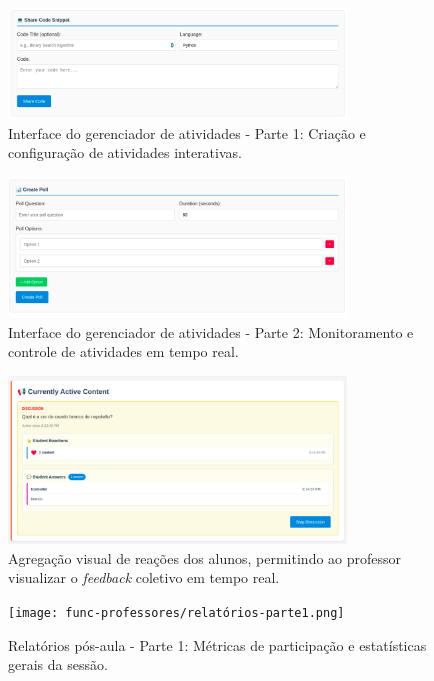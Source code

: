 \begin{figure}[H]
\centering
\includegraphics[width=0.8\textwidth]{func-professores/gerenciamento-atividades-parte1.png}
\caption{Interface do gerenciador de atividades - Parte 1: Criação e configuração de atividades interativas.}
\label{fig:func-prof-atividades-1}
\end{figure}

\begin{figure}[H]
\centering
\includegraphics[width=0.8\textwidth]{func-professores/gerenciamento-atividades-parte2.png}
\caption{Interface do gerenciador de atividades - Parte 2: Monitoramento e controle de atividades em tempo real.}
\label{fig:func-prof-atividades-2}
\end{figure}

\begin{figure}[H]
\centering
\includegraphics[width=0.8\textwidth]{func-professores/agregacao-reacao.png}
\caption{Agregação visual de reações dos alunos, permitindo ao professor visualizar o \textit{feedback} coletivo em tempo real.}
\label{fig:func-prof-reacoes}
\end{figure}

\begin{figure}[H]
\centering
\texttt{[image: func-professores/relatórios-parte1.png]}
\caption{Relatórios pós-aula - Parte 1: Métricas de participação e estatísticas gerais da sessão.}
\label{fig:func-prof-relatorios-1}
\end{figure}

